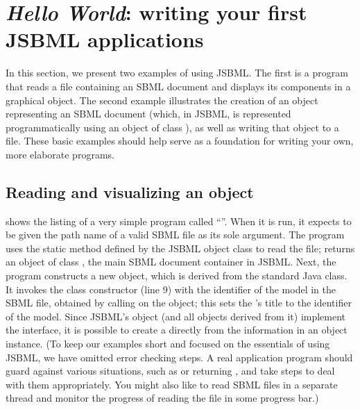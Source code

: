
\section[Writing your first JSBML application]{\emph{Hello World}: writing your first JSBML applications}
\label{sec:hello-world}

In this section, we present two examples of using JSBML. The first is a
program that reads a file containing an SBML document and displays its
components in a \JTree graphical object. The second example
illustrates the creation of an object representing an SBML document (which,
in JSBML, is represented programmatically using an object of class
\SBMLDocument), as well as writing that object to a file. These basic
examples should help serve as a foundation for writing your own, more
elaborate programs.


\subsection{Reading and visualizing an  object}

 shows the listing of a very simple
program called ``''. When it is run, it expects to
be given the path name of a valid SBML file as  its
sole argument. The program uses the static method  defined
by the JSBML object class \SBMLReader to read the file; \SBMLReader
returns an object of class \SBMLDocument, the main SBML document
container in JSBML.  Next, the program constructs a new
 object, which is derived from the standard Java
\JFrame class. It invokes the class constructor (line 9) with the
identifier of the model in the SBML file, obtained by calling
 on the \SBMLDocument object; this sets the
\JFrame's title to the identifier of the model. Since JSBML's \SBase
object (and all objects derived from it) implement the \TreeNode
interface, it is possible to create a \JTree directly from the
information in an \SBMLDocument object instance.  (To keep our examples
short and focused on the essentials of using JSBML, we have omitted
error checking steps.  A real application program should guard against
various situations, such as  or  returning , and
take steps to deal with them appropriately. You might also like to read SBML files 
in a separate thread and monitor the progress of reading the file in some progress bar.)

